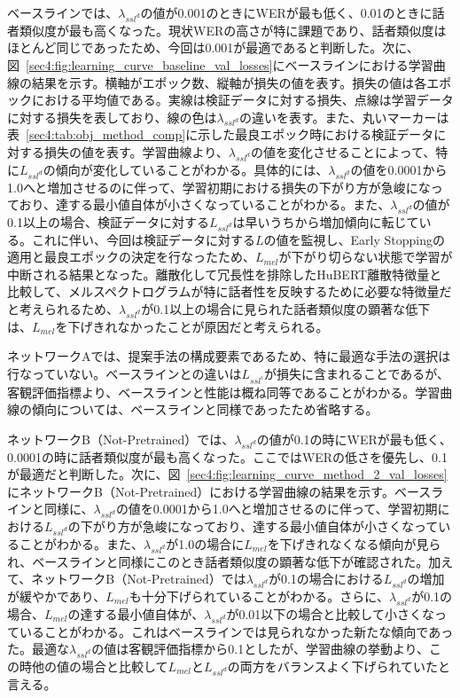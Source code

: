 \documentclass[12pt]{jarticle}
\numberwithin{equation}{section}    %
\numberwithin{figure}{section}      %
\numberwithin{table}{section}      %
\begin{document}
ベースラインでは、$\lambda_{ssl^{d}}$の値が0.001のときにWERが最も低く、0.01のときに話者類似度が最も高くなった。現状WERの高さが特に課題であり、話者類似度はほとんど同じであったため、今回は0.001が最適であると判断した。次に、図~\ref{sec4:fig:learning_curve_baseline_val_losses}にベースラインにおける学習曲線の結果を示す。横軸がエポック数、縦軸が損失の値を表す。損失の値は各エポックにおける平均値である。実線は検証データに対する損失、点線は学習データに対する損失を表しており、線の色は$\lambda_{ssl^{d}}$の違いを表す。また、丸いマーカーは表~\ref{sec4:tab:obj_method_comp}に示した最良エポック時における検証データに対する損失の値を表す。学習曲線より、$\lambda_{ssl^{d}}$の値を変化させることによって、特に$L_{ssl^{d}}$の傾向が変化していることがわかる。具体的には、$\lambda_{ssl^{d}}$の値を0.0001から1.0へと増加させるのに伴って、学習初期における損失の下がり方が急峻になっており、達する最小値自体が小さくなっていることがわかる。また、$\lambda_{ssl^{d}}$の値が0.1以上の場合、検証データに対する$L_{ssl^{d}}$は早いうちから増加傾向に転じている。これに伴い、今回は検証データに対する$L$の値を監視し、Early Stoppingの適用と最良エポックの決定を行なったため、$L_{mel}$が下がり切らない状態で学習が中断される結果となった。離散化して冗長性を排除したHuBERT離散特徴量と比較して、メルスペクトログラムが特に話者性を反映するために必要な特徴量だと考えられるため、$\lambda_{ssl^{d}}$が0.1以上の場合に見られた話者類似度の顕著な低下は、$L_{mel}$を下げきれなかったことが原因だと考えられる。

ネットワークAでは、提案手法の構成要素であるため、特に最適な手法の選択は行なっていない。ベースラインとの違いは$L_{ssl^{i}}$が損失に含まれることであるが、客観評価指標より、ベースラインと性能は概ね同等であることがわかる。学習曲線の傾向については、ベースラインと同様であったため省略する。

ネットワークB（Not-Pretrained）では、$\lambda_{ssl^{d}}$の値が0.1の時にWERが最も低く、0.0001の時に話者類似度が最も高くなった。ここではWERの低さを優先し、0.1が最適だと判断した。次に、図~\ref{sec4:fig:learning_curve_method_2_val_losses}にネットワークB（Not-Pretrained）における学習曲線の結果を示す。ベースラインと同様に、$\lambda_{ssl^{d}}$の値を0.0001から1.0へと増加させるのに伴って、学習初期における$L_{ssl^{d}}$の下がり方が急峻になっており、達する最小値自体が小さくなっていることがわかる。また、$\lambda_{ssl^{d}}$が1.0の場合に$L_{mel}$を下げきれなくなる傾向が見られ、ベースラインと同様にこのとき話者類似度の顕著な低下が確認された。加えて、ネットワークB（Not-Pretrained）では$\lambda_{ssl^{d}}$が0.1の場合における$L_{ssl^{d}}$の増加が緩やかであり、$L_{mel}$も十分下げられていることがわかる。さらに、$\lambda_{ssl^{d}}$が0.1の場合、$L_{mel}$の達する最小値自体が、$\lambda_{ssl^{d}}$が0.01以下の場合と比較して小さくなっていることがわかる。これはベースラインでは見られなかった新たな傾向であった。最適な$\lambda_{ssl^{d}}$の値は客観評価指標から0.1としたが、学習曲線の挙動より、この時他の値の場合と比較して$L_{mel}$と$L_{ssl^{d}}$の両方をバランスよく下げられていたと言える。
\end{document}
